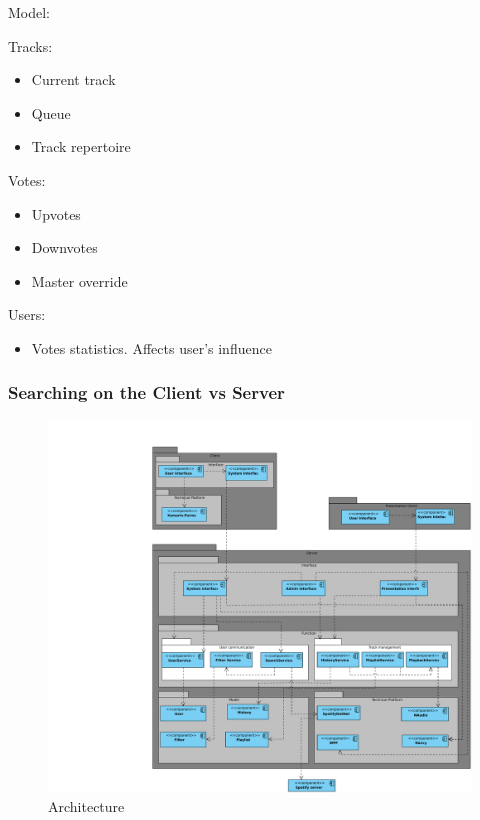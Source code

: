 \label{sec:architecture}


Model:

Tracks:
\begin{itemize}
  \item Current track
  \item Queue
  \item Track repertoire
\end{itemize}

Votes:
\begin{itemize}
  \item Upvotes
  \item Downvotes
  \item Master override
\end{itemize}

Users:
\begin{itemize}
  \item Votes statistics. Affects user's influence
\end{itemize}

\subsubsection{Searching on the Client vs Server}

\begin{figure}
  \centering
  \includegraphics[width=0.7\linewidth]{Images/Arkitektur.pdf}
  \caption{Architecture}
  \label{fig:architecture}
\end{figure}
	
